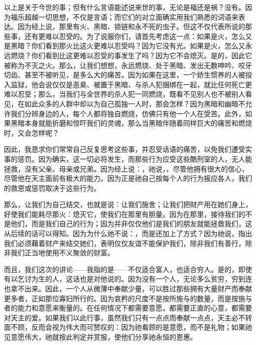 以上是关于今世的事；但有什么言语能述说来世的事，无论是福还是祸？没有。因为福乐超越一切思想，不仅是言语；而它们的对立面确实用我们熟悉的词语来表达。因为经上说，那里有火、黑暗、锁链和永不死的虫子。但这不仅代表所说的那些事，还有更难以忍受的。为了说服你们，请首先考虑这一点：如果是火，怎么又是黑暗？你们看到那火比这火更难以忍受吗？因为它没有光。如果是火，怎么又永远燃烧？你们看到比这更难以忍受的事发生了吗？因为它不会熄灭。是的，因此它被称为不灭之火。那么，让我们想想，永远燃烧、处于黑暗、发出无数呻吟、咬牙切齿、甚至不被听见，是多么大的痛苦。因为如果在这里，一个娇生惯养的人被投入监狱，他会说仅仅是恶臭、被置于黑暗、与杀人犯捆绑在一起，就比任何死亡更难以忍受；那么，当我们与全世界的杀人犯一同燃烧，既看不见别人也不被别人看见，在如此众多的人群中却以为自己孤独一人时，那会怎样？因为黑暗和幽暗不允许我们分辨身边的人，每个人都将独自燃烧，仿佛只有他一个人在受苦。此外，如果黑暗本身就能折磨和惊吓我们的灵魂，那么当黑暗伴随着同样巨大的痛苦和燃烧时，又会怎样呢？\par

因此，我恳求你们常常自己反复思考这些事，并忍受话语的痛苦，以免我们遭受实事的惩罚。因为确实，这一切必将发生，而那些行为应受这些酷刑室的人，无人能拯救，没有父亲、母亲或兄弟。因为经上说：，祂说，，尽管他拥有很大的信心，尽管他在天主面前有极大的能力。因为正是祂自己按每个人的行为报应各人，我们的救恩或惩罚取决于这些行为。\par

那么，让我们为自己结交，也就是说：让我们施舍；让我们把财产用在她们身上，好使我们能耗尽那火：熄灭它，使我们在那里有胆量。因为在那里，接待我们的不是他们，而是我们自己的行为；因为并非仅仅他们是我们的朋友就能拯救我们，这从后续的话可以得知。因为为什么祂不说：，而是还加上了方式？因为祂说，指出我们必须藉着财产来结交她们，表明仅仅友谊不能保护我们，除非我们有善行，除非我们正当地使用不义聚敛的财富。\par

而且，我们这次的讲论——我指的是——不仅适合富人，也适合穷人。是的，即使有以乞讨为生的人，这话也是对他说的。因为没有一个人，无论多么贫穷，穷到连也拿不出来。因此，一个人从微薄中奉献少量，可以胜过那些拥有大量财产而奉献更多者，正如那位寡妇所行的。因为哀矜的尺度不是按所施与的数量，而是按施与者的能力和意愿来衡量的。在任何情况下都需要意愿，都需要正直的心意，都需要对天主的爱。如果我们以此行事，虽然我们只有一点点而奉献一点点，天主必不转面不顾，反而会视为伟大而可赞叹的：因为祂看顾的是意愿，而不是礼物；如果祂见意愿伟大，祂就按此判定并赏报，使他们分享祂永恒的恩惠。\par


